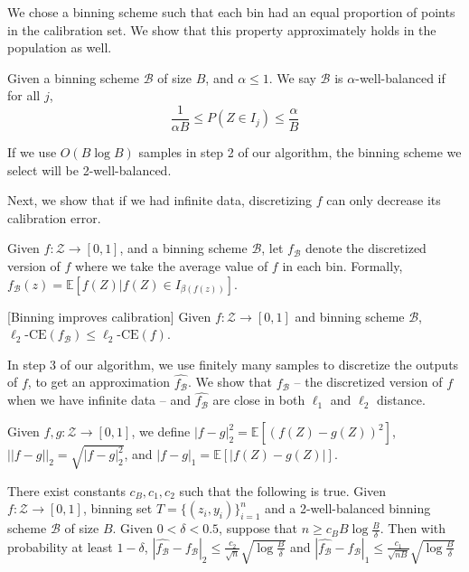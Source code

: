 We chose a binning scheme such that each bin had an equal proportion of points in the calibration set. We show that this property approximately holds in the population as well.

\begin{definition}
Given a binning scheme $\mathcal{B}$ of size $B$, and $\alpha \leq 1$. We say $\mathcal{B}$ is $\alpha$-well-balanced if for all $j$,
\[ \frac{1}{\alpha B} \leq P(Z \in I_j) \leq \frac{\alpha}{B}\]
\end{definition}

\begin{theorem}
\label{thm:well-ba-binning}
If we use $O(B \log{B})$ samples in step 2 of our algorithm, the binning scheme we select will be 2-well-balanced.
\end{theorem}

Next, we show that if we had infinite data, discretizing $f$ can only decrease its calibration error.

\begin{definition}
Given $f : \mathcal{Z} \to [0, 1]$, and a binning scheme $\mathcal{B}$, let $f_{\mathcal{B}}$ denote the discretized version of $f$ where we take the average value of $f$ in each bin. Formally, $f_{\mathcal{B}}(z) = \mathbb{E}[f(Z) | f(Z) \in I_{\beta(f(z))}]$. 
\end{definition}

\begin{lemma}
\label{lem:inf-binning}
[Binning improves calibration] Given $f : \mathcal{Z} \to [0, 1]$ and binning scheme $\mathcal{B}$, $\ell_2\mbox{-CE}(f_{\mathcal{B}}) \leq \ell_2\mbox{-CE}(f)$.
\end{lemma}

In step 3 of our algorithm, we use finitely many samples to discretize the outputs of $f$, to get an approximation $\hat{f_{\mathcal{B}}}$. We show that $f_{\mathcal{B}}$ -- the discretized version of $f$ when we have infinite data -- and $\hat{f_{\mathcal{B}}}$ are close in both $\ell_1$ and $\ell_2$ distance.

\begin{definition} 
Given $f, g : \mathcal{Z} \to [0, 1]$, we define $|f - g|_2^2 = \mathbb{E}[(f(Z) - g(Z))^2]$, $||f- g||_2 = \sqrt{|f - g|_2^2}$, and $|f- g|_1 = \mathbb{E}[\lvert f(Z) - g(Z) \rvert]$.
\end{definition}

\begin{theorem}
\label{thm:empirical-binning}
There exist constants $c_B, c_1, c_2$ such that the following is true. Given $f : \mathcal{Z} \to [0, 1]$, binning set $T = \{(z_i, y_i)\}_{i=1}^n$ and a 2-well-balanced binning scheme $\mathcal{B}$ of size $B$. Given $0 < \delta < 0.5$, suppose that $n \geq c_B B\log{\frac{B}{\delta}}$. Then with probability at least $1 - \delta$,  $|\hat{f_{\mathcal{B}}} - f_{\mathcal{B}}|_2 \leq \frac{c_2}{\sqrt{n}}\sqrt{\log{\frac{B}{\delta}}}$ and $|\hat{f_{\mathcal{B}}} - f_{\mathcal{B}}|_1 \leq \frac{c_1}{\sqrt{nB}}\sqrt{\log{\frac{B}{\delta}}}$
\end{theorem}

